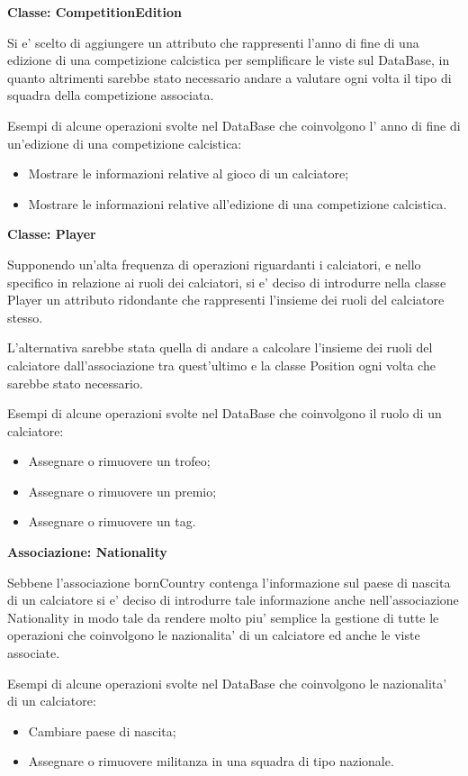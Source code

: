 \textbf{Classe: CompetitionEdition}

Si e' scelto di  aggiungere un attributo che rappresenti l'anno di fine di una edizione di una
competizione calcistica per semplificare le viste sul DataBase, in quanto altrimenti sarebbe
stato necessario andare a valutare ogni volta il tipo di squadra della competizione associata.

Esempi di alcune operazioni svolte nel DataBase che coinvolgono l' anno di fine di un'edizione
di una competizione calcistica:
\begin{itemize}
	\item Mostrare le informazioni relative al gioco di un calciatore;
	\item Mostrare le informazioni relative all'edizione di una competizione calcistica.
\end{itemize}

\textbf{Classe: Player}

Supponendo un'alta frequenza di operazioni riguardanti i calciatori, e nello specifico in relazione
ai ruoli dei calciatori, si e' deciso di introdurre nella classe Player un attributo ridondante
che rappresenti l'insieme dei ruoli del calciatore stesso.

L'alternativa sarebbe stata quella di andare a calcolare l'insieme dei ruoli del calciatore
dall'associazione tra quest'ultimo e la classe Position ogni volta che sarebbe stato necessario.

Esempi di alcune operazioni svolte nel DataBase che coinvolgono il ruolo di un calciatore:
\begin{itemize}
	\item Assegnare o rimuovere un trofeo;
	\item Assegnare o rimuovere un premio;
	\item Assegnare o rimuovere un tag.
\end{itemize}


\textbf{Associazione: Nationality}

Sebbene l'associazione bornCountry contenga l'informazione sul paese di nascita di un calciatore
si e' deciso di introdurre tale informazione anche nell'associazione Nationality in modo tale da
rendere molto piu' semplice la gestione di tutte le operazioni che coinvolgono le nazionalita'
di un calciatore ed anche le viste associate.

Esempi di alcune operazioni svolte nel DataBase che coinvolgono le nazionalita' di un calciatore:
\begin{itemize}
	\item Cambiare paese di nascita;
	\item Assegnare o rimuovere militanza in una squadra di tipo nazionale.
\end{itemize}

